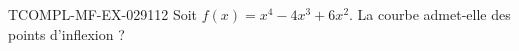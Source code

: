 \begin{exercice}{TCOMPL-MF-EX-029}{1}{12}
Soit $f(x) = x^4 - 4x^3 + 6x^2$. La courbe admet-elle des points d'inflexion ?

\end{exercice}
